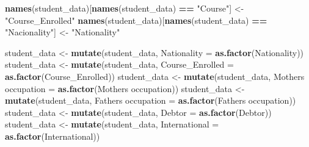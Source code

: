 \documentclass[
]{article}
\newenvironment{Shaded}{\begin{snugshade}}{\end{snugshade}}
\newcommand{\AttributeTok}[1]{\textcolor[rgb]{0.13,0.29,0.53}{#1}}
\newcommand{\FunctionTok}[1]{\textcolor[rgb]{0.13,0.29,0.53}{\textbf{#1}}}
\newcommand{\NormalTok}[1]{#1}
\newcommand{\OtherTok}[1]{\textcolor[rgb]{0.56,0.35,0.01}{#1}}
\newcommand{\SpecialCharTok}[1]{\textcolor[rgb]{0.81,0.36,0.00}{\textbf{#1}}}
\newcommand{\StringTok}[1]{\textcolor[rgb]{0.31,0.60,0.02}{#1}}
\begin{document}
\begin{Shaded}
\begin{Highlighting}[]
\FunctionTok{names}\NormalTok{(student\_data)[}\FunctionTok{names}\NormalTok{(student\_data) }\SpecialCharTok{==} \StringTok{"Course"}\NormalTok{] }\OtherTok{\textless{}{-}} \StringTok{"Course\_Enrolled"}
\FunctionTok{names}\NormalTok{(student\_data)[}\FunctionTok{names}\NormalTok{(student\_data) }\SpecialCharTok{==} \StringTok{"Nacionality"}\NormalTok{] }\OtherTok{\textless{}{-}} \StringTok{"Nationality"}

\NormalTok{student\_data }\OtherTok{\textless{}{-}} \FunctionTok{mutate}\NormalTok{(student\_data, }\StringTok{\textasciigrave{}}\AttributeTok{Nationality}\StringTok{\textasciigrave{}} \OtherTok{=} \FunctionTok{as.factor}\NormalTok{(}\StringTok{\textasciigrave{}}\AttributeTok{Nationality}\StringTok{\textasciigrave{}}\NormalTok{))}
\NormalTok{student\_data }\OtherTok{\textless{}{-}} \FunctionTok{mutate}\NormalTok{(student\_data, }\StringTok{\textasciigrave{}}\AttributeTok{Course\_Enrolled}\StringTok{\textasciigrave{}} \OtherTok{=} \FunctionTok{as.factor}\NormalTok{(}\StringTok{\textasciigrave{}}\AttributeTok{Course\_Enrolled}\StringTok{\textasciigrave{}}\NormalTok{))}
\NormalTok{student\_data }\OtherTok{\textless{}{-}} \FunctionTok{mutate}\NormalTok{(student\_data, }\StringTok{\textasciigrave{}}\AttributeTok{Mother\textquotesingle{}s occupation}\StringTok{\textasciigrave{}} \OtherTok{=} \FunctionTok{as.factor}\NormalTok{(}\StringTok{\textasciigrave{}}\AttributeTok{Mother\textquotesingle{}s occupation}\StringTok{\textasciigrave{}}\NormalTok{))}
\NormalTok{student\_data }\OtherTok{\textless{}{-}} \FunctionTok{mutate}\NormalTok{(student\_data, }\StringTok{\textasciigrave{}}\AttributeTok{Father\textquotesingle{}s occupation}\StringTok{\textasciigrave{}} \OtherTok{=} \FunctionTok{as.factor}\NormalTok{(}\StringTok{\textasciigrave{}}\AttributeTok{Father\textquotesingle{}s occupation}\StringTok{\textasciigrave{}}\NormalTok{))}
\NormalTok{student\_data }\OtherTok{\textless{}{-}} \FunctionTok{mutate}\NormalTok{(student\_data, }\StringTok{\textasciigrave{}}\AttributeTok{Debtor}\StringTok{\textasciigrave{}} \OtherTok{=} \FunctionTok{as.factor}\NormalTok{(}\StringTok{\textasciigrave{}}\AttributeTok{Debtor}\StringTok{\textasciigrave{}}\NormalTok{))}
\NormalTok{student\_data }\OtherTok{\textless{}{-}} \FunctionTok{mutate}\NormalTok{(student\_data, }\StringTok{\textasciigrave{}}\AttributeTok{International}\StringTok{\textasciigrave{}} \OtherTok{=} \FunctionTok{as.factor}\NormalTok{(}\StringTok{\textasciigrave{}}\AttributeTok{International}\StringTok{\textasciigrave{}}\NormalTok{))}
\end{Highlighting}
\end{Shaded}
\end{document}
